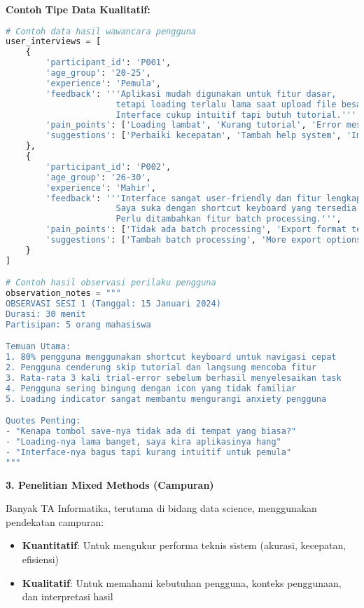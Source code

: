 \textbf{Contoh Tipe Data Kualitatif:}
\begin{lstlisting}[language=python, style=python, caption=Contoh Data Kualitatif dalam Penelitian]
# Contoh data hasil wawancara pengguna
user_interviews = [
    {
        'participant_id': 'P001',
        'age_group': '20-25',
        'experience': 'Pemula',
        'feedback': '''Aplikasi mudah digunakan untuk fitur dasar,
                      tetapi loading terlalu lama saat upload file besar.
                      Interface cukup intuitif tapi butuh tutorial.''',
        'pain_points': ['Loading lambat', 'Kurang tutorial', 'Error message tidak jelas'],
        'suggestions': ['Perbaiki kecepatan', 'Tambah help system', 'Improve error handling']
    },
    {
        'participant_id': 'P002',
        'age_group': '26-30',
        'experience': 'Mahir',
        'feedback': '''Interface sangat user-friendly dan fitur lengkap.
                      Saya suka dengan shortcut keyboard yang tersedia.
                      Perlu ditambahkan fitur batch processing.''',
        'pain_points': ['Tidak ada batch processing', 'Export format terbatas'],
        'suggestions': ['Tambah batch processing', 'More export options']
    }
]

# Contoh hasil observasi perilaku pengguna
observation_notes = """
OBSERVASI SESI 1 (Tanggal: 15 Januari 2024)
Durasi: 30 menit
Partisipan: 5 orang mahasiswa

Temuan Utama:
1. 80% pengguna menggunakan shortcut keyboard untuk navigasi cepat
2. Pengguna cenderung skip tutorial dan langsung mencoba fitur
3. Rata-rata 3 kali trial-error sebelum berhasil menyelesaikan task
4. Pengguna sering bingung dengan icon yang tidak familiar
5. Loading indicator sangat membantu mengurangi anxiety pengguna

Quotes Penting:
- "Kenapa tombol save-nya tidak ada di tempat yang biasa?"
- "Loading-nya lama banget, saya kira aplikasinya hang"
- "Interface-nya bagus tapi kurang intuitif untuk pemula"
"""
\end{lstlisting}

\textbf{3. Penelitian Mixed Methods (Campuran)}

Banyak TA Informatika, terutama di bidang data science, menggunakan pendekatan campuran:
\begin{itemize}
    \item \textbf{Kuantitatif}: Untuk mengukur performa teknis sistem (akurasi, kecepatan, efisiensi)
    \item \textbf{Kualitatif}: Untuk memahami kebutuhan pengguna, konteks penggunaan, dan interpretasi hasil
\end{itemize}

